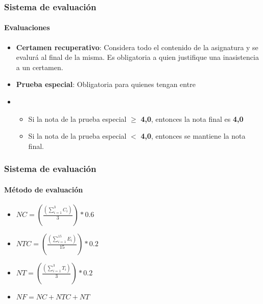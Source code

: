 \documentclass{beamer}
\begin{document}
		\begin{frame}
			\frametitle{Sistema de evaluaci\'on}
			\framesubtitle{Evaluaciones}
			\begin{itemize}
				\item \textbf{Certamen recuperativo}: Considera todo el contenido de la asignatura y se evalur\'a al final de la misma. Es obligatoria a quien justifique una inasistencia a un certamen.
				\item \textbf{Prueba especial}: Obligatoria para quienes tengan  entre \color{red}{3.5} \color{black}{y} \color{red}{3.9} \color{black}{en a lo menos uno de los tres items anteriores (Certamenes, Ejercicios o Tareas).}
				\item  \color{black}{En caso de rendir la prueba especial:}
				\begin{itemize}
    				\item Si la nota de la prueba especial $\geq$ \textbf{4,0}, entonces la nota final es \textbf{4,0}
	    			\item Si la nota de la prueba especial $<$ \textbf{4,0}, entonces se mantiene la nota final.
				\end{itemize}
			\end{itemize}
		\end{frame}

		\newpage
		\begin{frame}
			\frametitle{Sistema de evaluaci\'on}
			\framesubtitle{M\'etodo de evaluaci\'on}
			\begin{block}{}
				\begin{center}
					\begin{itemize}
  							\item$NC =(\displaystyle\frac{\left(\displaystyle\sum_{i=1}^{3}{C_{i}}\right)}{3})*0.6$ \\
								\item$NTC = (\displaystyle\frac{\left(\displaystyle\sum_{i=1}^{15}{E_{i}}\right)}{15})*0.2 $\\
  							\item$NT = (\displaystyle\frac{\left(\displaystyle\sum_{i=1}^{3}{T_{i}}\right)}{3})*0.2 $\\
								\item$NF = NC + NTC + NT  $\\
					\end{itemize}
				\end{center}
		\end{block}
	\end{frame}
\newpage
\end{document}
